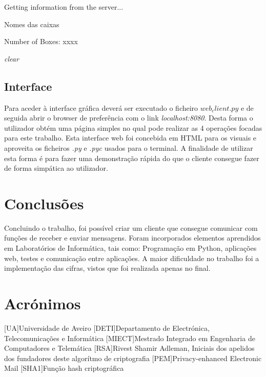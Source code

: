 \documentclass{report}
\begin{document}
	Getting information from the server...

	Nomes das caixas
	
	Number of Boxes: xxxx
	
	\textit{clear}
	

\section{Interface}
Para aceder à interface gráfica deverá ser executado o ficheiro \textit{$web_client.py$} 
e de seguida abrir o browser de preferência com o link \textit{localhost:8080}. 
Desta forma o utilizador obtém uma página simples no qual pode realizar as 4 operações focadas para este trabalho. 
Esta interface web foi concebida em HTML para os visuais e aproveita os ficheiros \textit{.py} e \textit{.pyc} usados para o terminal. 
A finalidade de utilizar esta forma é para fazer uma demonstração rápida do que o cliente consegue fazer de forma simpática ao utilizador.

\chapter{Conclusões}
\label{chap.conc}

Concluindo o trabalho, foi possível criar um cliente que consegue comunicar com funções de receber e enviar mensagens. Foram incorporados elementos aprendidos em Laboratórios de Informática, tais como: Programação em Python, aplicações web, testes e comunicação entre aplicações. A maior dificuldade no trabalho foi a implementação das cifras, vistos que foi realizada apenas no final.


\chapter*{Acrónimos}
\begin{acronym}
 [UA]{Universidade de Aveiro}
 [DETI]{Departamento de Electrónica, Telecomunicações e Informática}
 [MIECT]{Mestrado Integrado em Engenharia de Computadores e Telemática}
 [RSA]{Rivest Shamir Adleman, Iniciais dos apelidos dos fundadores deste algorítmo de criptografia}
 [PEM]{Privacy-enhanced Electronic Mail}
 [SHA1]{Função hash criptográfica}
\end{acronym}


%
\end{document}
